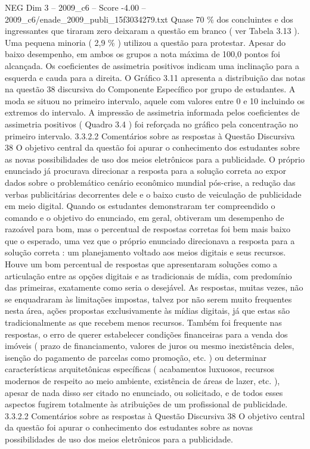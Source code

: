 \begin{textsample}{NEG Dim 3 – 2009\_c6 – Score -4.00 – 2009\_c6/enade\_2009\_publi\_15f3034279.txt}
Quase 70 \% dos concluintes e dos ingressantes que tiraram zero deixaram a questão em branco ( ver Tabela 3.13 ).
Uma pequena minoria ( 2,9 \% ) utilizou a questão para protestar.
Apesar do baixo desempenho, em ambos os grupos a nota máxima de 100,0 pontos foi alcançada.
Os coeficientes de assimetria positivos indicam uma inclinação para a esquerda e cauda para a direita.
O Gráfico 3.11 apresenta a distribuição das notas na questão 38 discursiva do Componente Específico por grupo de estudantes.
A moda se situou no primeiro intervalo, aquele com valores entre 0 e 10 incluindo os extremos do intervalo.
A impressão de assimetria informada pelos coeficientes de assimetria positivos ( Quadro 3.4 ) foi reforçada no gráfico pela concentração no primeiro intervalo. 3.3.2.2 Comentários sobre as respostas à Questão Discursiva 38 O objetivo central da questão foi apurar o conhecimento dos estudantes sobre as novas possibilidades de uso dos meios eletrônicos para a publicidade.
O próprio enunciado já procurava direcionar a resposta para a solução correta ao expor dados sobre o problemático cenário econômico mundial pós-crise, a redução das verbas publicitárias decorrentes dele e o baixo custo de veiculação de publicidade em meio digital.
Quando os estudantes demonstraram ter compreendido o comando e o objetivo do enunciado, em geral, obtiveram um desempenho de razoável para bom, mas o percentual de respostas corretas foi bem mais baixo que o esperado, uma vez que o próprio enunciado direcionava a resposta para a solução correta : um planejamento voltado aos meios digitais e seus recursos.
Houve um bom percentual de respostas que apresentaram soluções como a articulação entre as opções digitais e as tradicionais de mídia, com predomínio das primeiras, exatamente como seria o desejável.
As respostas, muitas vezes, não se enquadraram às limitações impostas, talvez por não serem muito frequentes nesta área, ações propostas exclusivamente às mídias digitais, já que estas são tradicionalmente as que recebem menos recursos.
Também foi frequente nas respostas, o erro de querer estabelecer condições financeiras para a venda dos imóveis ( prazo de financiamento, valores de juros ou mesmo inexistência deles, isenção do pagamento de parcelas como promoção, etc. ) ou determinar características arquitetônicas específicas ( acabamentos luxuosos, recursos modernos de respeito ao meio ambiente, existência de áreas de lazer, etc. ), apesar de nada disso ser citado no enunciado, ou solicitado, e de todos esses aspectos fugirem totalmente às atribuições de um profissional de publicidade. 3.3.2.2 Comentários sobre as respostas à Questão Discursiva 38 O objetivo central da questão foi apurar o conhecimento dos estudantes sobre as novas possibilidades de uso dos meios eletrônicos para a publicidade.

\end{textsample}
